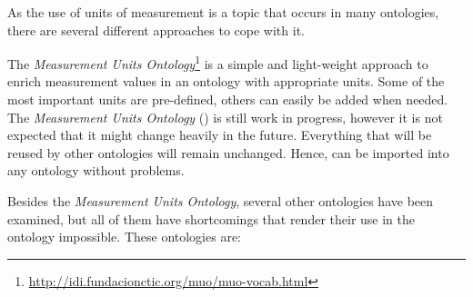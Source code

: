 As the use of units of measurement is a topic that occurs in many ontologies, there are several different approaches to cope with it.

The \emph{Measurement Units Ontology}\footnote{\href{http://idi.fundacionctic.org/muo/muo-vocab.html}{http://idi.fundacionctic.org/muo/muo-vocab.html}}\cite{MUO} is a simple and light-weight approach to enrich measurement values in an ontology with appropriate units. Some of the most important units are pre-defined, others can easily be added when needed. The \emph{Measurement Units Ontology} (\muo) is still work in progress, however it is not expected that it might change heavily in the future. Everything that will be reused by other ontologies will remain unchanged. Hence, \muo can be imported into any ontology without problems.

Besides the \emph{Measurement Units Ontology}, several other ontologies have been examined, but all of them have shortcomings that render their use in the \thinkhomeweather ontology impossible. These ontologies are:
